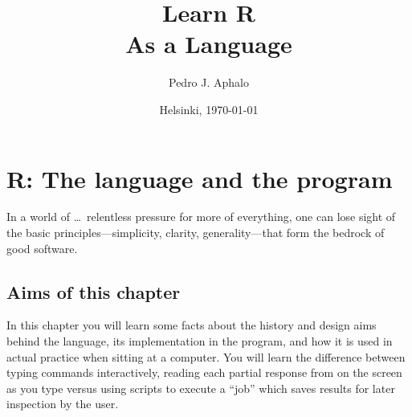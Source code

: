 \documentclass[krantz2]{krantz}\usepackage{knitr}
\begin{document}

\title{\Huge{\sffamily Learn R\\{\Large As a Language}}}

\author{Pedro J. Aphalo}

\date{Helsinki, \today}


















\frontmatter

\maketitle

\newpage

\setcounter{page}{5} %
\tableofcontents
%


\mainmatter






\chapter{R: The language and the program}\label{chap:R:introduction}

\begin{VF}
In a world of \ldots\ relentless pressure for more of everything, one can lose sight of the basic principles---simplicity, clarity, generality---that form the bedrock of good software.

\nocite{Kernighan1999}
\end{VF}


\section{Aims of this chapter}

In this chapter you will learn some facts about the history and design aims behind the \Rlang language, its implementation in the \Rpgrm program, and how it is used in actual practice when sitting at a computer. You will learn the difference between typing commands interactively, reading each partial response from \Rlang on the screen as you type versus using \Rlang scripts to execute a ``job'' which saves results for later inspection by the user.
\end{document}
